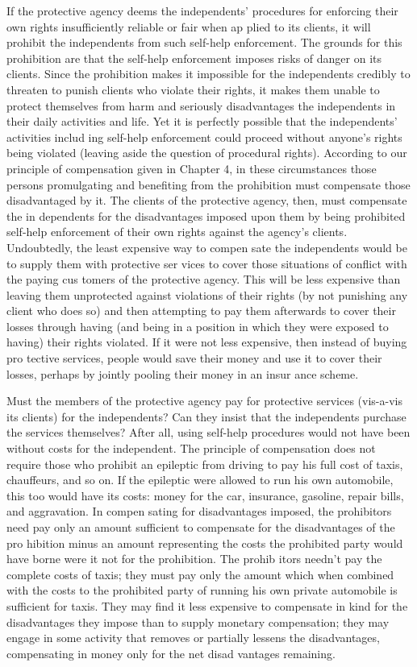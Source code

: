 \documentclass[11pt,openany]{book}
\begin{document}
If the protective agency deems the independents' procedures for enforcing their own rights insufficiently reliable or fair when ap plied to its clients, it will prohibit the independents from such self-help enforcement. The grounds for this prohibition are that the self-help enforcement imposes risks of danger on its clients. Since the prohibition makes it impossible for the independents credibly to threaten to punish clients who violate their rights, it makes them unable to protect themselves from harm and seriously disadvantages the independents in their daily activities and life. Yet it is perfectly possible that the independents' activities includ ing self-help enforcement could proceed without anyone's rights being violated (leaving aside the question of procedural rights). According to our principle of compensation given in Chapter 4, in these circumstances those persons promulgating and benefiting from the prohibition must compensate those disadvantaged by it. The clients of the protective agency, then, must compensate the in dependents for the disadvantages imposed upon them by being prohibited self-help enforcement of their own rights against the agency's clients. Undoubtedly, the least expensive way to compen sate the independents would be to supply them with protective ser vices to cover those situations of conflict with the paying cus tomers of the protective agency. This will be less expensive than leaving them unprotected against violations of their rights (by not punishing any client who does so) and then attempting to pay them afterwards to cover their losses through having (and being in a position in which they were exposed to having) their rights violated. If it were not less expensive, then instead of buying pro tective services, people would save their money and use it to cover their losses, perhaps by jointly pooling their money in an insur ance scheme. 

Must the members of the protective agency pay for protective services (vis-a-vis its clients) for the independents? Can they insist that the independents purchase the services themselves? After all, using self-help procedures would not have been without costs for the independent. The principle of compensation does not require those who prohibit an epileptic from driving to pay his full cost of taxis, chauffeurs, and so on. If the epileptic were allowed to run his own automobile, this too would have its costs: money for the car, insurance, gasoline, repair bills, and aggravation. In compen sating for disadvantages imposed, the prohibitors need pay only an amount sufficient to compensate for the disadvantages of the pro hibition minus an amount representing the costs the prohibited party would have borne were it not for the prohibition. The prohib itors needn't pay the complete costs of taxis; they must pay only the amount which when combined with the costs to the prohibited party of running his own private automobile is sufficient for taxis. They may find it less expensive to compensate in kind for the disadvantages they impose than to supply monetary compensation; they may engage in some activity that removes or partially lessens the disadvantages, compensating in money only for the net disad vantages remaining. 
\end{document}
